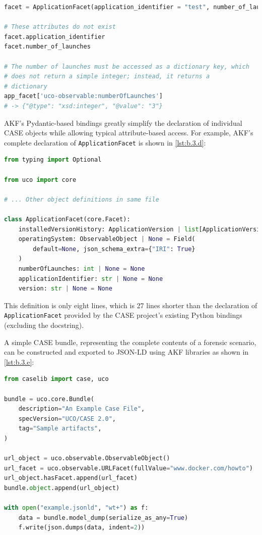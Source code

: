 \documentclass[letterpaper,12pt]{report}
\newcommand{\passthrough}[1]{#1}
\begin{document}
\begin{lstlisting}[label={lst:b.3.c}, caption={Sample usage of official CASE Python bindings \cite{CaseworkCASEMappingPython}}, language=Python]
facet = ApplicationFacet(application_identifier = "test", number_of_launches=3)

# These attributes do not exist
facet.application_identifier
facet.number_of_launches

# The number of launches must be accessed as a dictionary key, which
# does not return a simple integer; instead, it returns a
# dictionary
app_facet['uco-observable:numberOfLaunches']
# -> {"@type": "xsd:integer", "@value": "3"}
\end{lstlisting}

AKF's Pydantic-based bindings greatly simplify the declaration of
individual CASE objects while allowing typical attribute-based access.
For example, AKF's complete declaration of
\passthrough{\lstinline!ApplicationFacet!} is shown in
\autoref{lst:b.3.d}:

\begin{lstlisting}[label={lst:b.3.d}, caption={Example of Pydantic-based CASE object declaration used by AKF}, language=Python]
from typing import Optional

from uco import core

# ... Other object definitions in same file

class ApplicationFacet(core.Facet):
    installedVersionHistory: ApplicationVersion | list[ApplicationVersion] | None = []
    operatingSystem: ObservableObject | None = Field(
        default=None, json_schema_extra={"IRI": True}
    )
    numberOfLaunches: int | None = None
    applicationIdentifier: str | None = None
    version: str | None = None
\end{lstlisting}

This definition is only eight lines, which is 27 lines shorter than the
declaration of \passthrough{\lstinline!ApplicationFacet!} provided by
the CASE project's existing Python bindings (excluding the docstring).

A simple CASE bundle, representing the complete contents of a forensic
scenario, can be constructed and exported to JSON-LD using AKF libraries
as shown in \autoref{lst:b.3.e}:

\begin{lstlisting}[label={lst:b.3.e}, caption={Demonstration of bundle serialization using the AKF Python bindings for CASE}, language=Python]
from caselib import case, uco

bundle = uco.core.Bundle(
    description="An Example Case File",
    specVersion="UCO/CASE 2.0",
    tag="Sample artifacts",
)

url_object = uco.observable.ObservableObject()
url_facet = uco.observable.URLFacet(fullValue="www.docker.com/howto")
url_object.hasFacet.append(url_facet)
bundle.object.append(url_object)

with open("example.jsonld", "wt+") as f:
    data = bundle.model_dump(serialize_as_any=True)
    f.write(json.dumps(data, indent=2))
\end{lstlisting}
\end{document}
